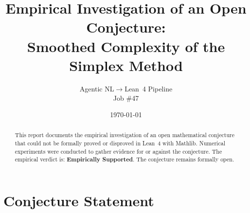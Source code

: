\documentclass[11pt]{article}
\title{Empirical Investigation of an Open Conjecture:\\
Smoothed Complexity of the Simplex Method}
\author{Agentic NL$\to$Lean~4 Pipeline \\ \small Job \#47}
\date{\today}
\begin{document}
\maketitle

\begin{abstract}
This report documents the empirical investigation of an open mathematical conjecture
that could not be formally proved or disproved in Lean~4 with Mathlib.
Numerical experiments were conducted to gather evidence for or against the conjecture.
The empirical verdict is: \textbf{\textcolor{green!70!black}{Empirically Supported}}.
The conjecture remains formally open.
\end{abstract}

\section{Conjecture Statement}
\end{document}
